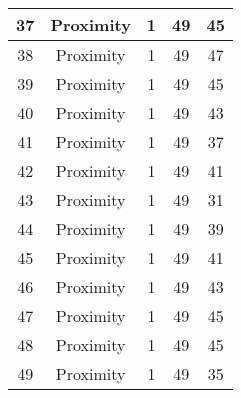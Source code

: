 \documentclass[results.tex]{subfiles}
\begin{document}
\begin{center}
\begin{tabular}{| c || c | c | c | c |}
            \hline
            37                      & Proximity                    & 1                      & 49                      & 45                   \\
            \hline
            38                      & Proximity                    & 1                      & 49                      & 47                   \\
            \hline
            39                      & Proximity                    & 1                      & 49                      & 45                   \\
            \hline
            40                      & Proximity                    & 1                      & 49                      & 43                   \\
            \hline
            41                      & Proximity                    & 1                      & 49                      & 37                   \\
            \hline
            42                      & Proximity                    & 1                      & 49                      & 41                   \\
            \hline
            43                      & Proximity                    & 1                      & 49                      & 31                   \\
            \hline
            44                      & Proximity                    & 1                      & 49                      & 39                   \\
            \hline
            45                      & Proximity                    & 1                      & 49                      & 41                   \\
            \hline
            46                      & Proximity                    & 1                      & 49                      & 43                   \\
            \hline
            47                      & Proximity                    & 1                      & 49                      & 45                   \\
            \hline
            48                      & Proximity                    & 1                      & 49                      & 45                   \\
            \hline
            49                      & Proximity                    & 1                      & 49                      & 35                   \\
            \hline
        \end{tabular}
    \end{center}
\end{document}
